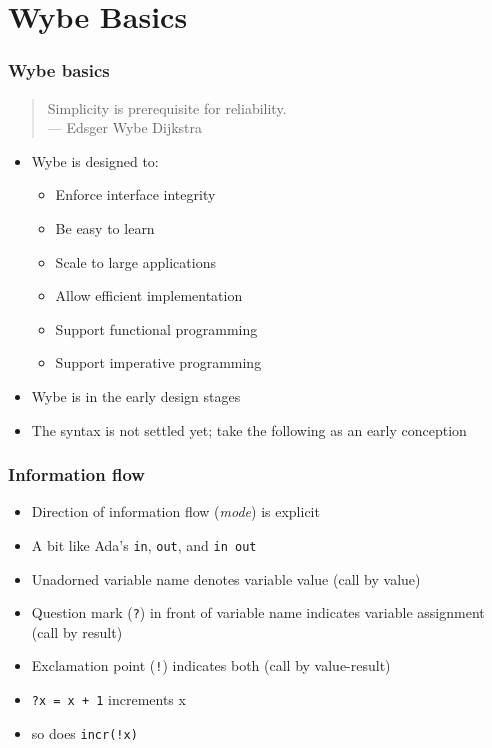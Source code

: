 \documentclass[12pt]{beamer}
\begin{document}
\section{Wybe Basics}

\begin{frame}
\frametitle{Wybe basics}
\begin{quotation}
Simplicity is prerequisite for reliability. \\
\hspace*{3em}--- Edsger Wybe Dijkstra
\end{quotation}

\begin{itemize}
\item Wybe is designed to:
  \begin{itemize}
  \item Enforce interface integrity
  \item Be easy to learn
  \item Scale to large applications
  \item Allow efficient implementation
  \item Support functional programming
  \item Support imperative programming
  \end{itemize}
\item Wybe is in the early design stages
\item The syntax is not settled yet; take the following as an early conception
\end{itemize}
\end{frame}


\begin{frame}
\frametitle{Information flow}
\begin{itemize}
\item Direction of information flow (\emph{mode}) is explicit
\item A bit like Ada's \texttt{in}, \texttt{out}, and \texttt{in out}
\item Unadorned variable name denotes variable value (call by value)
\item Question mark (\texttt{?}) in front of variable name indicates
  variable assignment (call by result)
\item Exclamation point (\texttt{!}) indicates both (call by value-result)
\item \texttt{?x = x + 1} increments x
\item so does \texttt{incr(!x)}
\end{itemize}
\end{frame}
\end{document}
